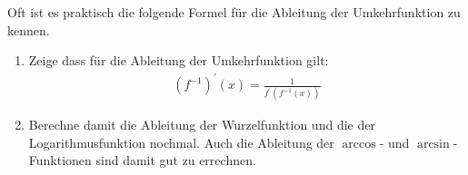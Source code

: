 \begin{exercise}
  Oft ist es praktisch die folgende Formel für die Ableitung der Umkehrfunktion
  zu kennen.
  \begin{enumerate}[label=(\alph*)]
  \item Zeige dass für die Ableitung der Umkehrfunktion gilt:
    \begin{equation*}
      \begin{split}
        \left(f^{-1}\right)^{\prime}(x) = \frac{1}{f^\prime (f^{-1}(x))}
      \end{split}
    \end{equation*}
  \item Berechne damit die Ableitung der Wurzelfunktion und die der
    Logarithmusfunktion nochmal. Auch die Ableitung der $\arccos$- und
    $\arcsin$-Funktionen sind damit gut zu errechnen.
  \end{enumerate}
\end{exercise}
